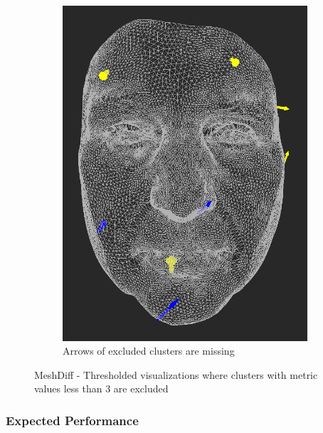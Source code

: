 \begin{figure}[h]
\begin{subfigure}{0.4\textwidth}
    \label{fig:meshdiff-thresholding_clustercolor}
	\end{subfigure}
    \qquad
    \begin{subfigure}{0.4\textwidth}
	\includegraphics[width=\textwidth]{./img/meshdiff-thresholding-arrows-length3.PNG}
    \caption{Arrows of excluded clusters are missing}
    \label{fig:meshdiff-thresholding_arrows}
	\end{subfigure}
    
\caption[MeshDiff - Thresholded visualizations]{MeshDiff - Thresholded visualizations where clusters with metric values less than 3 are excluded}
\label{fig:meshdiff-thresholding}
\end{figure}

\subsubsection{Expected Performance}

